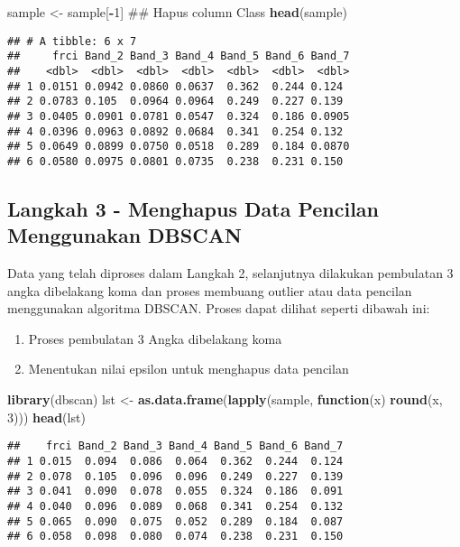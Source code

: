 \documentclass[]{article}
\newenvironment{Shaded}{\begin{snugshade}}{\end{snugshade}}
\newcommand{\KeywordTok}[1]{\textcolor[rgb]{0.13,0.29,0.53}{\textbf{#1}}}
\newcommand{\DecValTok}[1]{\textcolor[rgb]{0.00,0.00,0.81}{#1}}
\newcommand{\StringTok}[1]{\textcolor[rgb]{0.31,0.60,0.02}{#1}}
\newcommand{\ControlFlowTok}[1]{\textcolor[rgb]{0.13,0.29,0.53}{\textbf{#1}}}
\newcommand{\OperatorTok}[1]{\textcolor[rgb]{0.81,0.36,0.00}{\textbf{#1}}}
\newcommand{\NormalTok}[1]{#1}
\providecommand{\tightlist}{%
  \setlength{\itemsep}{0pt}\setlength{\parskip}{0pt}}
\begin{document}
\begin{Shaded}
\begin{Highlighting}[]
\NormalTok{sample <-}\StringTok{ }\NormalTok{sample[}\OperatorTok{-}\DecValTok{1}\NormalTok{] ## Hapus column Class}
\KeywordTok{head}\NormalTok{(sample)}
\end{Highlighting}
\end{Shaded}

\begin{verbatim}
## # A tibble: 6 x 7
##     frci Band_2 Band_3 Band_4 Band_5 Band_6 Band_7
##    <dbl>  <dbl>  <dbl>  <dbl>  <dbl>  <dbl>  <dbl>
## 1 0.0151 0.0942 0.0860 0.0637  0.362  0.244 0.124 
## 2 0.0783 0.105  0.0964 0.0964  0.249  0.227 0.139 
## 3 0.0405 0.0901 0.0781 0.0547  0.324  0.186 0.0905
## 4 0.0396 0.0963 0.0892 0.0684  0.341  0.254 0.132 
## 5 0.0649 0.0899 0.0750 0.0518  0.289  0.184 0.0870
## 6 0.0580 0.0975 0.0801 0.0735  0.238  0.231 0.150
\end{verbatim}

\subsection{Langkah 3 - Menghapus Data Pencilan Menggunakan
DBSCAN}\label{langkah-3---menghapus-data-pencilan-menggunakan-dbscan}

Data yang telah diproses dalam Langkah 2, selanjutnya dilakukan
pembulatan 3 angka dibelakang koma dan proses membuang outlier atau data
pencilan menggunakan algoritma DBSCAN. Proses dapat dilihat seperti
dibawah ini:

\begin{enumerate}
\def\labelenumi{\arabic{enumi}.}
\tightlist
\item
  Proses pembulatan 3 Angka dibelakang koma
\item
  Menentukan nilai epsilon untuk menghapus data pencilan
\end{enumerate}

\begin{Shaded}
\begin{Highlighting}[]
\KeywordTok{library}\NormalTok{(dbscan)}
\NormalTok{lst <-}\StringTok{ }\KeywordTok{as.data.frame}\NormalTok{(}\KeywordTok{lapply}\NormalTok{(sample, }\ControlFlowTok{function}\NormalTok{(x) }\KeywordTok{round}\NormalTok{(x, }\DecValTok{3}\NormalTok{)))}
\KeywordTok{head}\NormalTok{(lst)}
\end{Highlighting}
\end{Shaded}

\begin{verbatim}
##    frci Band_2 Band_3 Band_4 Band_5 Band_6 Band_7
## 1 0.015  0.094  0.086  0.064  0.362  0.244  0.124
## 2 0.078  0.105  0.096  0.096  0.249  0.227  0.139
## 3 0.041  0.090  0.078  0.055  0.324  0.186  0.091
## 4 0.040  0.096  0.089  0.068  0.341  0.254  0.132
## 5 0.065  0.090  0.075  0.052  0.289  0.184  0.087
## 6 0.058  0.098  0.080  0.074  0.238  0.231  0.150
\end{verbatim}
\end{document}
